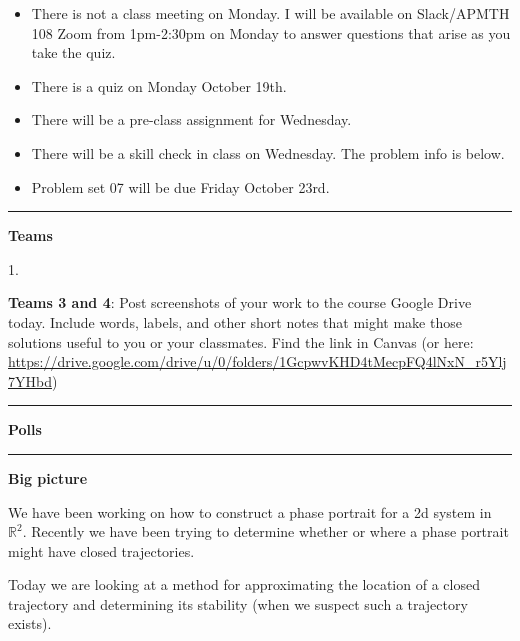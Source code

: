 \documentclass[12pt,letterpaper,noanswers]{exam}
\begin{document}
 \pdfpageheight 11in 
  \pdfpagewidth 8.5in

\noindent 




\begin{itemize}

   
    \item There is not a class meeting on Monday.  I will be available on Slack/APMTH 108 Zoom from 1pm-2:30pm on Monday to answer questions that arise as you take the quiz.
        \item There is a quiz on Monday October 19th.  
    \item There will be a pre-class assignment for Wednesday.
    \item There will be a skill check in class on Wednesday.  The problem info is below.
 \item Problem set 07 will be due Friday October 23rd.
\end{itemize}

\hrule
\vspace{0.2cm}



\noindent\textbf{Teams}

\begin{multicols}{2}
1. 

\end{multicols}

\noindent \textbf{Teams 3 and 4}: Post screenshots of your work to the course Google Drive today.  Include words, labels, and other short notes that might make those solutions useful to you or your classmates.  Find the link in Canvas (or here: \url{https://drive.google.com/drive/u/0/folders/1GcpwvKHD4tMecpFQ4lNxN_r5Ylj7YHbd})

\vspace{0.2cm}

\hrule
\vspace{0.2cm}

\noindent\textbf{Polls}


\vspace{0.2cm}

\hrule
\vspace{0.2cm}

\noindent\textbf{Big picture}

We have been working on how to construct a phase portrait for a 2d system in $\mathbb{R}^2.$ Recently we have been trying to determine whether or where a phase portrait might have closed trajectories.

Today we are looking at a method for approximating the location of a closed trajectory and determining its stability (when we suspect such a trajectory exists).
\end{document}
